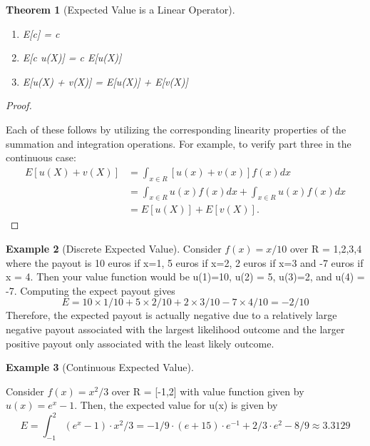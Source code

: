 \documentclass[10pt,]{book}
\theoremstyle{plain}
\newtheorem{theorem}{Theorem}[section]
\theoremstyle{definition}
\theoremstyle{definition}
\newtheorem{example}[theorem]{Example}
\theoremstyle{definition}
\numberwithin{equation}{section}
\begin{document}
\begin{theorem}[{Expected Value is a Linear Operator}]\label{theorem-27}

	\leavevmode%
\begin{enumerate}
\item\hypertarget{li-184}{}E[c] = c%
\item\hypertarget{li-185}{}E[c u(X)] = c E[u(X)]%
\item\hypertarget{li-186}{}E[u(X) + v(X)] = E[u(X)] + E[v(X)]%
\end{enumerate}

\end{theorem}
\begin{proof}\hypertarget{proof-29}{}
Each of these follows by utilizing the corresponding linearity properties of the summation and integration operations. For example, to verify part three in the continuous case:
	\begin{align*}
E[u(X) + v(X)] & = \int_{x \in R} [u(x)+v(x)]f(x) dx\\
 & = \int_{x \in R} u(x)f(x) dx + \int_{x \in R} u(x)f(x) dx\\
 & = E[u(X)] + E[v(X)].
\end{align*}
\end{proof}
\begin{example}[Discrete Expected Value]\label{example-17}
Consider \(f(x) = x/10\) over R = {1,2,3,4} where the payout is 10 euros if x=1, 5 euros if x=2, 2 euros if x=3 and -7 euros if x = 4.  Then your value function would be u(1)=10, u(2) = 5, u(3)=2, and u(4) = -7. Computing the expect payout gives
	\begin{equation*}E = 10 \times 1/10 + 5 \times 2/10 + 2 \times 3/10 - 7 \times 4/10 = -2/10\end{equation*}
	Therefore, the expected payout is actually negative due to a relatively large negative payout associated with the largest likelihood outcome and the larger positive payout only associated with the least likely outcome.
\end{example}
\begin{example}[Continuous Expected Value]\label{example-18}

	Consider \(f(x) = x^2/3\) over R = [-1,2] with value function given by \(u(x) = e^x - 1\). Then, the expected value for u(x) is given by
	\begin{equation*}E = \int_{-1}^2 (e^x-1) \cdot x^2/3 = -1/9 \cdot (e + 15) \cdot e^{-1} + 2/3 \cdot e^2 - 8/9 \approx 3.3129\end{equation*}
\end{example}
\end{document}
